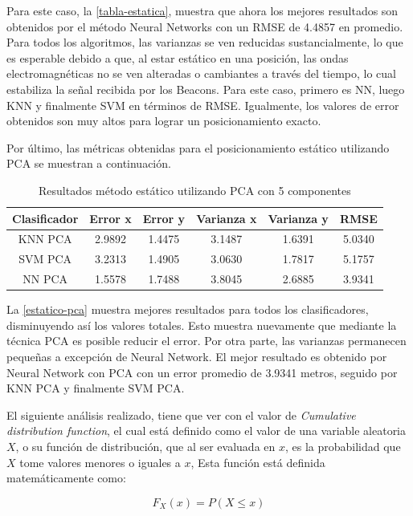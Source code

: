 Para este caso, la \autoref{tabla-estatica}, muestra que ahora los mejores resultados son obtenidos por el método Neural Networks con un RMSE de 4.4857 en promedio. Para todos los algoritmos, las varianzas se ven reducidas sustancialmente, lo que es esperable debido a que, al estar estático en una posición, las ondas electromagnéticas no se ven alteradas o cambiantes a través del tiempo, lo cual estabiliza la señal recibida por los Beacons. Para este caso, primero es NN, luego KNN y finalmente SVM en términos de RMSE. Igualmente, los valores de error obtenidos son muy altos para lograr un posicionamiento exacto.

Por último, las métricas obtenidas para el posicionamiento estático utilizando PCA se muestran a continuación.

\begin{table}[!h]
\centering
\caption[Resultados método estático utilizando PCA con 5 componentes]{Resultados método estático utilizando PCA con 5 componentes}
\label{estatico-pca}
\begin{tabular}{|c|c|c|c|c|c|}
\hline
Clasificador & Error x & Error y & Varianza x & Varianza y & RMSE   \\ \hline
KNN PCA      & 2.9892  & 1.4475  & 3.1487     & 1.6391     & 5.0340 \\ \hline
SVM PCA      & 3.2313  & 1.4905  & 3.0630     & 1.7817     & 5.1757 \\ \hline
NN PCA       & 1.5578  & 1.7488  & 3.8045    & 2.6885     & 3.9341 \\ \hline
\end{tabular}
\end{table}
 
La \autoref{estatico-pca} muestra mejores resultados para todos los clasificadores, disminuyendo así los valores totales. Esto muestra nuevamente que mediante la técnica PCA es posible reducir el error. Por otra parte, las varianzas permanecen pequeñas a excepción de Neural Network. El mejor resultado es obtenido por Neural Network con PCA con un error promedio de 3.9341 metros, seguido por KNN PCA y finalmente SVM PCA.

El siguiente análisis realizado, tiene que ver con el valor de \textit{Cumulative distribution function}, el cual está definido como el valor de una variable aleatoria $X$, o su función de distribución, que al ser evaluada en $x$, es la probabilidad que $X$ tome valores menores o iguales a $x$, Esta función está definida matemáticamente como:

\begin{equation}
F_{X} (x) = P(X \le x)
\end{equation}

